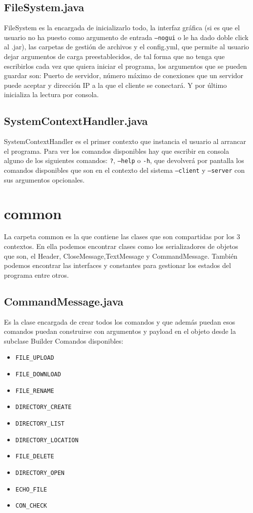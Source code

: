 \documentclass[a4paper, 12pt]{report}
\begin{document}
\section{FileSystem.java}
FileSystem es la encargada de inicializarlo todo, la interfaz gráfica (si es que el usuario no ha puesto como argumento de entrada \texttt{--nogui} o le ha dado doble click al .jar), las carpetas de gestión de archivos y el config.yml, que permite al usuario dejar argumentos de carga preestablecidos, de tal forma que no tenga que escribirlos cada vez que quiera iniciar el programa, los argumentos que se pueden guardar son:
Puerto de servidor, número máximo de conexiones que un servidor puede aceptar y dirección IP a la que el cliente se conectará.
Y por último inicializa la lectura por consola.
\section{SystemContextHandler.java}
SystemContextHandler es el primer contexto que instancia el usuario al arrancar el programa. 
Para ver los comandos disponibles hay que escribir en consola alguno de los siguientes comandos: 
\texttt{?}, \texttt{--help} o \texttt{-h}, que devolverá por pantalla los comandos disponibles que son 
en el contexto del sistema \texttt{--client} y \texttt{--server} con sus argumentos opcionales.


\chapter{common}

La carpeta common es la que contiene las clases que son compartidas por los 3 contextos. En ella podemos encontrar clases como los serializadores de objetos que son, el Header, CloseMessage,TextMessage y CommandMessage. También podemos encontrar las interfaces y constantes para gestionar los estados del programa entre otros.
\section{CommandMessage.java}

Es la clase encargada de crear todos los comandos y que además puedan esos comandos puedan construirse con argumentos y payload en el objeto desde la subclase Builder
Comandos disponibles:

\begin{itemize}
	\item \texttt{FILE\_UPLOAD}
	\item \texttt{FILE\_DOWNLOAD}
	\item \texttt{FILE\_RENAME}
	\item \texttt{DIRECTORY\_CREATE}
	\item \texttt{DIRECTORY\_LIST}
	\item \texttt{DIRECTORY\_LOCATION}
	\item \texttt{FILE\_DELETE}
	\item \texttt{DIRECTORY\_OPEN}
	\item \texttt{ECHO\_FILE}
	\item \texttt{CON\_CHECK}
\end{itemize}
\end{document}
